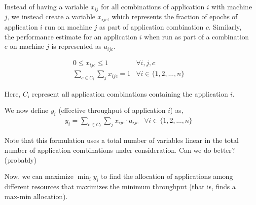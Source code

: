 \documentclass{article}
\begin{document}
Instead of having a variable $x_{ij}$ for all combinations of application $i$
with machine $j$, we instead create a variable $x_{ijc}$,
which represents the fraction of epochs of application $i$ run on machine $j$
as part of application combination $c$.
Similarly, the performance estimate for an application $i$ when run as part of
a combination $c$ on machine $j$ is represented as $a_{ijc}$.

\begin{eqnarray}
0 \leq x_{ijc} \leq 1 & \forall i,j,c \nonumber \\
\sum_{c \in C_i} \sum_j x_{ijc} = 1 & \forall i \in \{1, 2, \ldots, n\} \nonumber
\end{eqnarray}

Here, $C_i$ represent all application combinations containing the application $i$.

We now define $y_i$ (effective throughput of application $i$) as,
\begin{eqnarray}
y_i = \sum_{c \in C_i} \sum_j x_{ijc} \cdot a_{ijc} & \forall i \in \{1, 2, \ldots, n\} \nonumber
\end{eqnarray}

Note that this formulation uses a total number of variables
linear in the total number of application combinations
under consideration. Can we do better? (probably)

Now, we can maximize $\min_i y_i$ to find the allocation of applications among
different resources that maximizes the minimum throughput (that is, finds a
max-min allocation).
\end{document}
